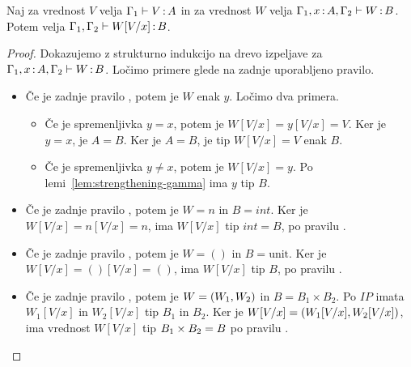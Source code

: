 \begin{lema}\label{lem:substitucija-vrednosti}
	Naj za vrednost $V$ velja $\Gamma_1 \vdash V \mathinner{:} A$ in za vrednost $W$ velja $\Gamma_1, x \mathinner{:} A, \Gamma_2 \vdash W \mathinner{:} B$. Potem velja $\Gamma_1, \Gamma_2 \vdash W[V/x] \mathinner{:} B$.
\end{lema}

\begin{proof}
	Dokazujemo z strukturno indukcijo na drevo izpeljave za $\Gamma_1, x \mathinner{:} A, \Gamma_2 \vdash W \mathinner{:} B$.
	Ločimo primere glede na zadnje uporabljeno pravilo.
	
	\begin{itemize}
		\item[\sitem] 
		Če je zadnje pravilo , potem je $W$ enak $y$. Ločimo dva primera.
		\begin{itemize}
			\item Če je spremenljivka $y = x$, potem je $W[V/x] = y[V/x] = V$. Ker je $y = x$, je $A = B$. Ker je $A = B$, je tip $W[V/x] = V$ enak $B$.
			\item Če je spremenljivka $y \neq x$, potem je $W[V/x] = y$. Po lemi~\ref{lem:strengthening-gamma} ima $y$ tip $B$.
		\end{itemize}
		
	
		\item Če je zadnje pravilo , potem je $W=n$ in $B=int$. Ker je $W[V/x] = n[V/x] = n$, ima $W[V/x]$ tip $int = B$, po pravilu .
		
		\item Če je zadnje pravilo , potem je $W=()$ in $B=\text{unit}$. Ker je $W[V/x] = ()[V/x] = ()$, ima $W[V/x]$ tip $B$, po pravilu .
		
		\item Če je zadnje pravilo , potem je $W =( W_1 , W_2 )$ in $B = B_1 \times B_2$. Po $IP$ imata $W_1[V/x]$ in $W_2[V/x]$ tip $B_1$ in $B_2$.
		Ker je $W[V/x] = ( W_1[V/x] , W_2[V/x] )$, ima vrednost $W[V/x]$ tip $B_1 \times B_2 = B$ po pravilu .
		

\end{itemize}
\end{proof}

